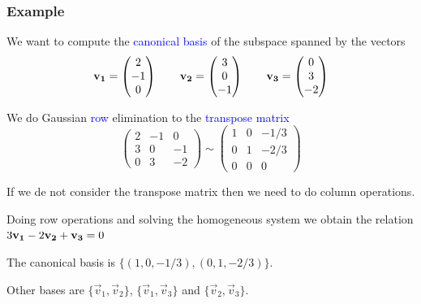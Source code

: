 \documentclass[11pt,aspectratio=169]{beamer}
\begin{document}
\begin{frame}
\frametitle{Example}
\begin{small}
We want to compute the  \textcolor{blue}{canonical basis} of  the  subspace spanned by the vectors
\begin{equation*}
{\bf v_1}=\begin{pmatrix}
2 \\
-1  \\
0 
\end{pmatrix}\qquad
{\bf v_2}=\begin{pmatrix}
3 \\
0  \\
-1 
\end{pmatrix}\qquad
{\bf v_3}=\begin{pmatrix}
0 \\
3  \\
-2 
\end{pmatrix}
\end{equation*}

We do  Gaussian \textcolor{blue}{row} elimination to the \textcolor{blue}{transpose matrix}
\begin{equation*}
\begin{pmatrix}
2&-1&0 \\
3  &0&-1\\
0 &3&-2
\end{pmatrix}\sim
\begin{pmatrix}
1&0&-1/3 \\
0  &1&-2/3\\
0 &0&0
\end{pmatrix}
\end{equation*}

\begin{tiny} If  we  de not consider the transpose matrix then  we need to do column operations.

Doing row operations and solving  the homogeneous system we obtain the relation
$3 {\bf v_1}-2{\bf v_2}+{\bf  v_3}=0$\end{tiny}
\vskip 10pt
The canonical basis is $\{(1,0,-1/3), (0,1,-2/3)\}$.

\begin{tiny} Other bases are $\{\vec{v}_1, \vec{v}_2\}$, $\{\vec{v}_1, \vec{v}_3\}$ and $\{\vec{v}_2, \vec{v}_3\}$.
\end{tiny}

\end{small}
\end{frame}
\end{document}
